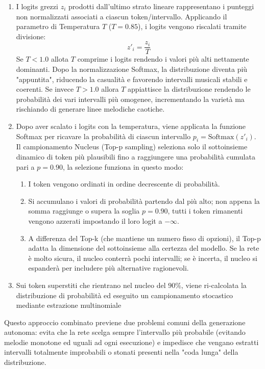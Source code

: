 \begin{enumerate}
    \item I logits grezzi $z_i$ prodotti dall'ultimo strato lineare rappresentano i punteggi non normalizzati associati a ciascun token/intervallo. Applicando il parametro di Temperatura $T$ ($T = 0.85$), i logits vengono riscalati tramite divisione:  $$z'_i = \frac{z_i}{T}$$
Se $T<1.0$ allota $T$ comprime i logits rendendo i valori più alti nettamente dominanti. Dopo la normalizzazione Softmax, la distribuzione diventa più "appuntita", riducendo la casualità e favorendo intervalli musicali stabili e coerenti. 
Se invece $T>1.0$ allora $T$ appiattisce la distribuzione rendendo le probabilità dei vari intervalli più omogenee, incrementando la varietà ma rischiando di generare linee melodiche caotiche.

    \item Dopo aver scalato i logits con la temperatura, viene applicata la funzione Softmax per ricavare la probabilità di ciascun intervallo $p_i = \text{Softmax}(z'_i)$. Il campionamento Nucleus (Top-p sampling) seleziona solo il sottoinsieme dinamico di token più plausibili fino a raggiungere una probabilità cumulata pari a $p = 0.90$, la selezione funziona in questo modo:
     \begin{enumerate}
        \item I token vengono ordinati in ordine decrescente di probabilità.
        \item Si accumulano i valori di probabilità partendo dal più alto; non appena la somma raggiunge o supera la soglia $p = 0.90$, tutti i token rimanenti vengono azzerati impostando il loro logit a $-\infty$.
        \item A differenza del Top-k (che mantiene un numero fisso di opzioni), il Top-p adatta la dimensione del sottoinsieme alla certezza del modello. Se la rete è molto sicura, il nucleo conterrà pochi intervalli; se è incerta, il nucleo si espanderà per includere più alternative ragionevoli.
    \end{enumerate}
    \item Sui token superstiti che rientrano nel nucleo del $90\%$, viene ri-calcolata la distribuzione di probabilità ed eseguito un campionamento stocastico mediante estrazione multinomiale
\end{enumerate}
Questo approccio combinato previene due problemi comuni della generazione autonoma: evita che la rete scelga sempre l'intervallo più probabile (evitando melodie monotone ed uguali ad ogni esecuzione) e impedisce che vengano estratti intervalli totalmente improbabili o stonati presenti nella "coda lunga" della distribuzione.



